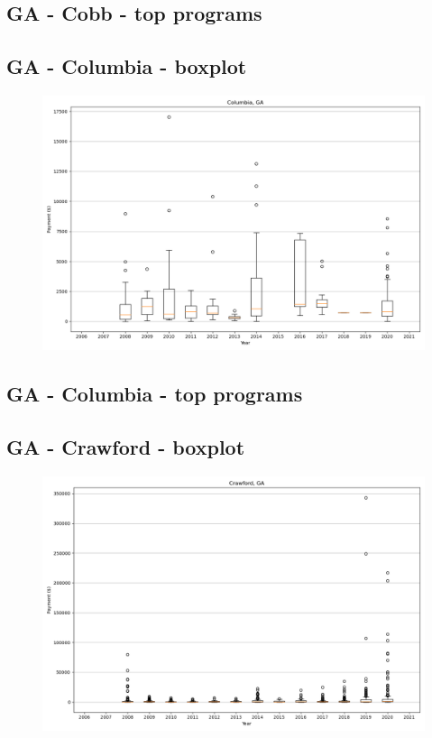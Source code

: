 \subsection*{GA - Cobb - top programs}

\newpage
\subsection*{GA - Columbia - boxplot}
\begin{figure}[h]
\centering
\includegraphics[width=7in]{../output/boxplots/counties/Columbia-GA_boxplot.png}
\end{figure}


\subsection*{GA - Columbia - top programs}

\newpage
\subsection*{GA - Crawford - boxplot}
\begin{figure}[h]
\centering
\includegraphics[width=7in]{../output/boxplots/counties/Crawford-GA_boxplot.png}
\end{figure}



